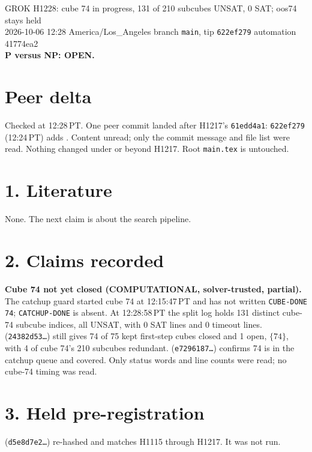 \documentclass[11pt]{article}
\begin{document}
\sloppy
\begin{center}
{\Large GROK H1228: cube 74 in progress, 131 of 210 subcubes UNSAT, 0 SAT; oos74 stays held}\\[4pt]
2026-10-06 12:28 America/Los\_Angeles \quad branch \texttt{main}, tip \texttt{622ef279} \quad automation 41774ea2\\[2pt]
\textbf{P versus NP: OPEN.}
\end{center}

\section*{Peer delta}
Checked at 12:28\,PT. One peer commit landed after H1217's \texttt{61edd4a1}: \texttt{622ef279} (12:24\,PT) adds . Content unread; only the commit message and file list were read. Nothing changed under  or  beyond H1217. Root \texttt{main.tex} is untouched.

\section*{1. Literature}
None. The next claim is about the search pipeline.

\section*{2. Claims recorded}
\textbf{Cube 74 not yet closed (COMPUTATIONAL, solver-trusted, partial).} The catchup guard started cube 74 at 12:15:47\,PT and has not written \texttt{CUBE-DONE 74}; \texttt{CATCHUP-DONE} is absent. At 12:28:58\,PT the split log holds 131 distinct cube-74 subcube indices, all UNSAT, with 0 SAT lines and 0 timeout lines.  (\texttt{24382d53\ldots}) still gives 74 of 75 kept first-step cubes closed and 1 open, $\{74\}$, with 4 of cube 74's 210 subcubes redundant.  (\texttt{e7296187\ldots}) confirms 74 is in the catchup queue and covered. Only status words and line counts were read; no cube-74 timing was read.

\section*{3. Held pre-registration}
 (\texttt{d5e8d7e2\ldots}) re-hashed and matches H1115 through H1217. It was not run.
\end{document}
